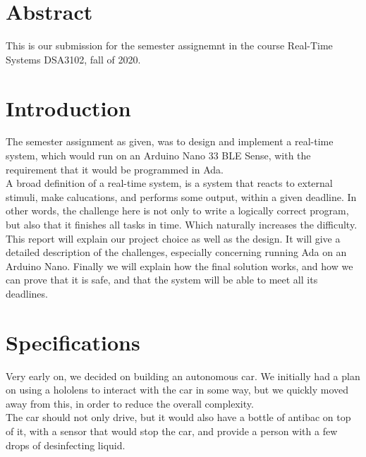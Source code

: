 \documentclass{article}
\begin{document}
\maketitle

\newpage
\tableofcontents


\newpage
\section{Abstract}
This is our submission for the semester assignemnt in the course Real-Time Systems DSA3102, fall of 2020.


\section{Introduction}
The semester assignment as given, was to design and implement a real-time system, which would run on an Arduino Nano 33 BLE Sense, with the requirement that it would be programmed in Ada.\\ 


A broad definition of a real-time system, is a system that reacts to external stimuli, make calucations, and performs some output, within a given deadline. In other words, the challenge here is not only to write a logically correct program, but also that it finishes all tasks in time. Which naturally increases the difficulty.\\ 


This report will explain our project choice as well as the design. It will give a detailed description of the challenges, especially concerning running Ada on an Arduino Nano. Finally we will explain how the final solution works, and how we can prove that it is safe, and that the system will be able to meet all its deadlines.\\ 


\section{Specifications}

Very early on, we decided on building an autonomous car. We initially had a plan on using a hololens to interact with the car in some way, but we quickly moved away from this, in order to reduce the overall complexity.\\ 

The car should not only drive, but it would also have a bottle of antibac on top of it, with a sensor that would stop the car, and provide a person with a few drops of desinfecting liquid.\\ 
\end{document}

